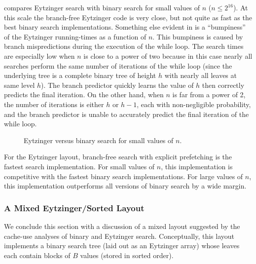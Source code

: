\documentclass{patmorin}
\begin{document}
 compares Eytzinger search with binary search for
small values of $n$ ($n\le 2^{16}$).  At this scale
the branch-free Eytzinger code is very close, but not quite as fast
as the best binary search implementations.  Something else evident in
 is a ``bumpiness'' of the Eytzinger running-times
as a function of $n$.  This bumpiness is caused by branch mispredictions
during the execution of the while loop.  The search times are especially
low when $n$ is close to a power of two because in this case nearly all
searches perform the same number of iterations of the while loop (since
the underlying tree is a complete binary tree of height $h$ with nearly
all leaves at same level $h$).  The branch predictor quickly learns
the value of $h$ then correctly predicts the final iteration.  On the
other hand, when $n$ is far from a power of 2, the number of iterations
is either $h$ or $h-1$, each with non-negligible probability, and the
branch predictor is unable to accurately predict the final iteration of
the while loop.

\begin{figure}
   \caption{Eytzinger versus binary search for small values of $n$.}
\end{figure}



\begin{lesson}
  For the Eytzinger layout, branch-free search with explicit prefetching
  is the fastest search implementation. For small values of $n$,
  this implementation is competitive with the fastest binary search
  implementations. For large values of $n$, this implementation
  outperforms all versions of binary search by a wide margin.
\end{lesson}

\subsubsection{A Mixed Eytzinger/Sorted Layout}

We conclude this section with a discussion of a mixed layout suggested by
the cache-use analyses of binary and Eytzinger search.  Conceptually, this
layout implements a binary search tree (laid out as an Eytzinger array)
whose leaves each contain blocks of $B$ values (stored in sorted order).
\end{document}
